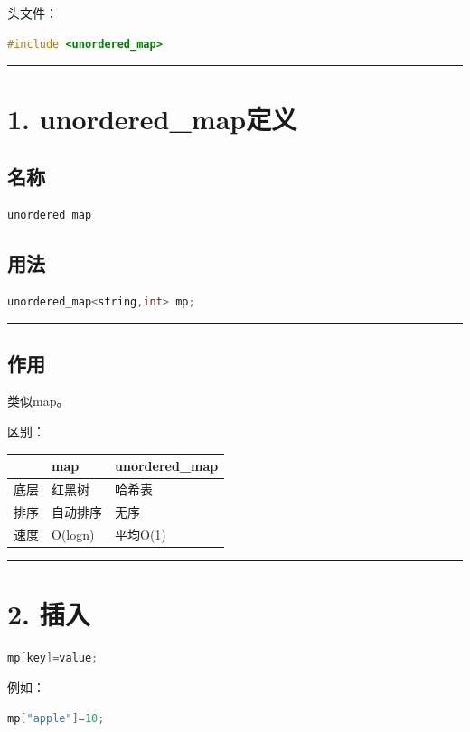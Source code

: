 \documentclass[10pt,twocolumn]{extarticle}
\begin{document}
头文件：
\begin{lstlisting}[language=C++]
#include <unordered_map>
\end{lstlisting}

\noindent\rule{\linewidth}{0.4pt}

\section{1. unordered\_map定义}

\subsection{名称}
\begin{lstlisting}[language=C++]
unordered_map
\end{lstlisting}

\subsection{用法}
\begin{lstlisting}[language=C++]
unordered_map<string,int> mp;
\end{lstlisting}

\noindent\rule{\linewidth}{0.4pt}

\subsection{作用}
类似map。

区别：
\begin{table}[h]
\centering
\begin{tabular}{|l|l|l|}
\hline
 & map & unordered\_map \\ \hline
底层 & 红黑树 & 哈希表 \\ \hline
排序 & 自动排序 & 无序 \\ \hline
速度 & O(logn) & 平均O(1) \\ \hline
\end{tabular}
\end{table}

\noindent\rule{\linewidth}{0.4pt}

\section{2. 插入}
\begin{lstlisting}[language=C++]
mp[key]=value;
\end{lstlisting}
例如：
\begin{lstlisting}[language=C++]
mp["apple"]=10;
\end{lstlisting}
\end{document}
